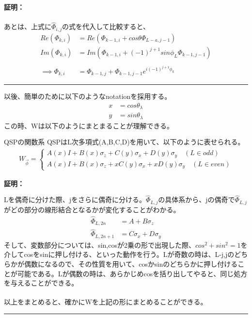 \documentclass[a4paper,10.5pt]{article}
\numberwithin{equation}{section}
\newenvironment{proofbox}
{\begin{prooflabel}\textbf{証明：}\end{prooflabel}\vspace{0.8em}}
{\par\vspace{1em}\hrule\vspace{1em}}
\begin{document}
\begin{proofbox}
\begin{enumerate}
\begin{align*}
        \end{align*}
        あとは、上式に$\hat{\Phi}_{i,j}$の式を代入して比較すると、
        \begin{align*}
            Re(\Phi_{k,i})&=Re(\Phi_{k-1,i}+cos\theta\Phi_{L-a,j-1})\\
            Im(\Phi_{k,i})&=Im(\Phi_{k-1,i}+(-1)^{j+1}sin\phi_{L}\Phi_{k-1,j-1})\\
            \\
            \implies \Phi_{k,i}&=\Phi_{k-1,j}+\Phi_{k-1,j-1}e^{i(-1)^{j+1}\phi_{k}}
        \end{align*}
    \end{enumerate}
\end{proofbox}
以後、簡単のために以下のようなnotationを採用する。
\begin{align*}
    x&=cos\theta_{\lambda}\\
    y&=sin\theta_{\lambda}
\end{align*}
この時、Wは以下のようにまとまることが理解できる。
\begin{resultbox}{QSPの関数系}
QSPはL次多項式(A,B,C,D)を用いて、以下のように表せられる。
    \begin{align*}
        W_{\vec{\phi}}=
        \begin{cases}
            A(x)I+B(x)\sigma_{z}+C(y)\sigma_{x}+D(y)\sigma_{y}\quad(L\in odd)\\
            A(x)I+B(x)\sigma_{z}+xC(y)\sigma_{x}+xD(y)\sigma_{y}\quad (L\in even)
        \end{cases}
    \end{align*}
\end{resultbox}
\begin{proofbox}
    Lを偶奇に分けた際、jをさらに偶奇に分ける。$\hat{\Phi}_{L,j}$の具体系から、jの偶奇で$\hat{\Phi}_{L,j}$がどの部分の線形結合となるかが変化することがわかる。
    \begin{align*}
        \hat{\Phi}_{L,2n}&=A+B\sigma_{z}\\
        \hat{\Phi}_{L,2n+1}&=C\sigma_{x}+D\sigma_{y}
    \end{align*}
    そして、変数部分については、sin,cosが2乗の形で出現した際、$cos^{2}+sin^{2}=1$を介してcosをsinに押し付ける、といった動作を行う。Lが奇数の時は、L-j,jのどちらかが偶数になるので、その性質を用いて、cosかsinのどちらかに押し付けることが可能である。Lが偶数の時は、あらかじめcosを括り出してやると、同じ処方を与えることができる。\\
    \\
    以上をまとめると、確かにWを上記の形にまとめることができる。
\end{proofbox}
\end{document}

